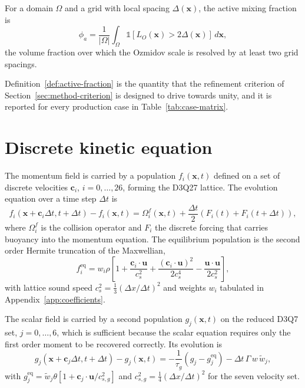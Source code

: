 \begin{definition}
\label{def:active-fraction}
For a domain $\Omega$ and a grid with local spacing $\Delta(\mathbf{x})$, the
active mixing fraction is
\begin{equation*}
  \phi_a = \frac{1}{|\Omega|} \int_{\Omega}
    \mathbb{1}\!\left[ L_O(\mathbf{x}) > 2\Delta(\mathbf{x}) \right] \, d\mathbf{x},
\end{equation*}
the volume fraction over which the Ozmidov scale is resolved by at least two
grid spacings.
\end{definition}

Definition~\ref{def:active-fraction} is the quantity that the refinement
criterion of Section~\ref{sec:method-criterion} is designed to drive towards
unity, and it is reported for every production case in
Table~\ref{tab:case-matrix}.

\section{Discrete kinetic equation}
\label{sec:theory-kinetic}

The momentum field is carried by a population $f_i(\mathbf{x},t)$ defined on a
set of discrete velocities $\mathbf{c}_i$, $i = 0, \dots, 26$, forming the D3Q27
lattice. The evolution equation over a time step $\Delta t$ is
\begin{equation}
  f_i(\mathbf{x} + \mathbf{c}_i \Delta t, t + \Delta t) - f_i(\mathbf{x}, t)
    = \Omega_i^{f}(\mathbf{x},t) + \frac{\Delta t}{2}\left( F_i(t) + F_i(t + \Delta t) \right),
  \label{eq:lbe-momentum}
\end{equation}
where $\Omega_i^{f}$ is the collision operator and $F_i$ the discrete forcing
that carries buoyancy into the momentum equation. The equilibrium population is
the second order Hermite truncation of the Maxwellian,
\begin{equation}
  f_i^{\mathrm{eq}} = w_i \rho \left[
    1 + \frac{\mathbf{c}_i \cdot \mathbf{u}}{c_s^{2}}
      + \frac{(\mathbf{c}_i \cdot \mathbf{u})^{2}}{2 c_s^{4}}
      - \frac{\mathbf{u} \cdot \mathbf{u}}{2 c_s^{2}} \right],
  \label{eq:equilibrium}
\end{equation}
with lattice sound speed $c_s^{2} = \tfrac{1}{3} (\Delta x / \Delta t)^{2}$ and
weights $w_i$ tabulated in Appendix~\ref{app:coefficients}.

The scalar field is carried by a second population $g_j(\mathbf{x},t)$ on the
reduced D3Q7 set, $j = 0, \dots, 6$, which is sufficient because the scalar
equation requires only the first order moment to be recovered correctly. Its
evolution is
\begin{equation}
  g_j(\mathbf{x} + \mathbf{c}_j \Delta t, t + \Delta t) - g_j(\mathbf{x},t)
    = -\frac{1}{\tau_g}\left( g_j - g_j^{\mathrm{eq}} \right)
      - \Delta t \, \Gamma \, w \, \tilde{w}_j,
  \label{eq:lbe-scalar}
\end{equation}
with $g_j^{\mathrm{eq}} = \tilde{w}_j \theta \left[ 1 + \mathbf{c}_j \cdot \mathbf{u} / c_{s,g}^{2} \right]$
and $c_{s,g}^{2} = \tfrac{1}{4}(\Delta x/\Delta t)^2$ for the seven velocity set.

